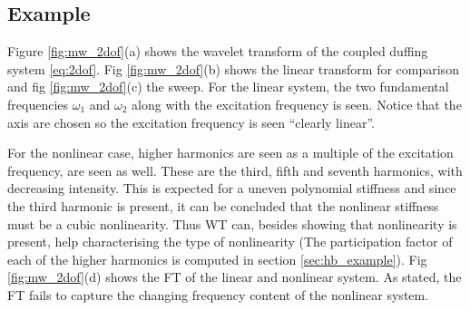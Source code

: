 \subsection{Example}
\label{sec:wt_example}


Figure \ref{fig:mw_2dof}(a) shows the wavelet transform of the coupled duffing
system \eqref{eq:2dof}. Fig \ref{fig:mw_2dof}(b) shows the linear transform for
comparison and fig \ref{fig:mw_2dof}(c) the sweep. For the linear system, the
two fundamental frequencies $\omega_1$ and $\omega_2$ along with the excitation
frequency is seen. Notice that the axis are chosen so the excitation frequency
is seen ``clearly linear''.

For the nonlinear case, higher harmonics are seen as a multiple of the
excitation frequency, are seen as well. These are the third, fifth and seventh
harmonics, with decreasing intensity. This is expected for a uneven polynomial
stiffness and since the third harmonic is present, it can be concluded that the
nonlinear stiffness must be a cubic nonlinearity. Thus WT can, besides showing
that nonlinearity is present, help characterising the type of nonlinearity (The
participation factor of each of the higher harmonics is computed in section
\ref{sec:hb_example}). Fig \ref{fig:mw_2dof}(d) shows the FT of the linear and
nonlinear system. As stated, the FT fails to capture the changing frequency
content of the nonlinear system.

